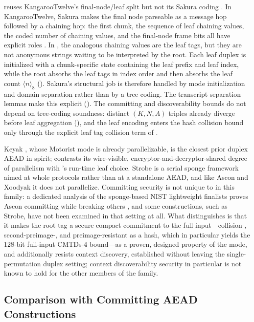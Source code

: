 \TW{} reuses KangarooTwelve's final-node/leaf split but not its Sakura coding
\cite{BDPV14}. In KangarooTwelve, Sakura makes the final node parseable as a
message hop followed by a chaining hop: the first chunk, the sequence of leaf
chaining values, the coded number of chaining values, and the final-node frame
bits all have explicit roles \cite{BDPVVV16}. In \TW{}, the analogous chaining
values are the leaf tags, but they are not anonymous strings waiting to be
interpreted by the root. Each leaf duplex is initialized with a chunk-specific
state containing the leaf prefix and leaf index, while the root absorbs the leaf
tags in index order and then absorbs the leaf count $\langle n \rangle_8$
(). Sakura's structural job is therefore handled
by mode initialization and domain separation rather than by a tree coding. The
transcript separation lemmas make this explicit
(). The committing and discoverability
bounds do not depend on tree-coding soundness: distinct $(K,N,A)$ triples
already diverge before leaf aggregation (), and the leaf
encoding enters the hash collision bound only through the explicit leaf tag
collision term of .

Keyak \cite{BDPVV16}, whose Motorist mode is already parallelizable, is the
closest prior duplex AEAD in spirit;  contrasts its
wire-visible, encryptor-and-decryptor-shared degree of parallelism with \TW{}'s
run-time leaf choice.
Strobe \cite{Ham17} is a serial sponge framework aimed at whole protocols rather
than at a standalone AEAD, and like Ascon and Xoodyak it does not parallelize.
Committing security is not unique to \TW{} in this family: a dedicated analysis
of the sponge-based NIST lightweight finalists proves Ascon committing while
breaking others \cite{KSW23}, and some constructions, such as Strobe, have not
been examined in that setting at all. What distinguishes \TW{} is that it makes
the root tag a secure compact commitment to the full input---collision-,
second-preimage-, and preimage-resistant as a hash, which in particular yields
the $128$-bit full-input \textsf{CMTDs-4} bound---as a proven,
designed property of the mode, and additionally resists \cite{MLGR23} context
discovery, established without leaving the single-permutation duplex
setting; context discoverability security in particular is not known to hold for
the other members of the family.

\subsection{Comparison with Committing AEAD Constructions}
\label{sec:compare-commit}

